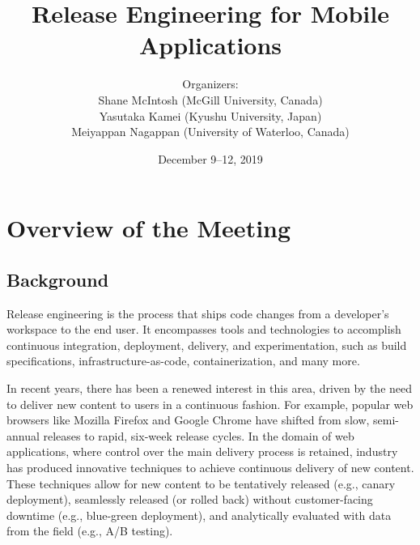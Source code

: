\documentclass[a4paper]{article}
\begin{document}
\SHONANmakecover

\def\tightlist{\itemsep1pt\parskip0pt\parsep0pt}

\title{Release Engineering for Mobile Applications}
\author{Organizers:\\
Shane McIntosh (McGill University, Canada)\\
Yasutaka Kamei (Kyushu University, Japan)\\
Meiyappan Nagappan (University of Waterloo, Canada)}
\date{December 9--12, 2019}
\maketitle

\section{Overview of the Meeting}

\subsection{Background}

Release engineering is the process that ships code changes from a developer's workspace to the end user.
It encompasses tools and technologies to accomplish continuous integration, deployment, delivery, and experimentation, such as build specifications, infrastructure-as-code, containerization, and many more.

In recent years, there has been a renewed interest in this area, driven by the need to deliver new content to users in a continuous fashion.
For example, popular web browsers like Mozilla Firefox and Google Chrome have shifted from slow, semi-annual releases to rapid, six-week release cycles.
In the domain of web applications, where control over the main delivery process is retained, industry has produced innovative techniques to achieve continuous delivery of new content.
These techniques allow for new content to be tentatively released (e.g., canary deployment), seamlessly released (or rolled back) without customer-facing downtime (e.g., blue-green deployment), and analytically evaluated with data from the field (e.g., A/B testing).
\end{document}
